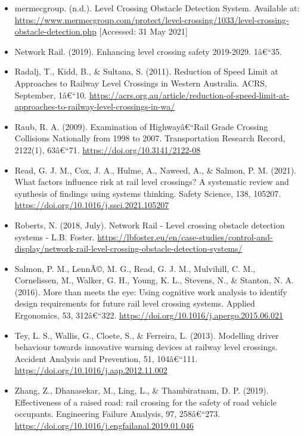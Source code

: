 \documentclass[
]{book}
\begin{document}
\begin{itemize}
\item
  mermecgroup. (n.d.). Level Crossing Obstacle Detection System. Available at: \url{https://www.mermecgroup.com/protect/level-crossing/1033/level-crossing-obstacle-detection.php} {[}Accessed: 31 May 2021{]}
\item
  Network Rail. (2019). Enhancing level crossing safety 2019-2029. 1â€``35.
\item
  Radalj, T., Kidd, B., \& Sultana, S. (2011). Reduction of Speed Limit at Approaches to Railway Level Crossings in Western Australia. ACRS, September, 1â€``10. \url{https://acrs.org.au/article/reduction-of-speed-limit-at-approaches-to-railway-level-crossings-in-wa/}
\item
  Raub, R. A. (2009). Examination of Highwayâ€``Rail Grade Crossing Collisions Nationally from 1998 to 2007. Transportation Research Record, 2122(1), 63â€``71. \url{https://doi.org/10.3141/2122-08}
\item
  Read, G. J. M., Cox, J. A., Hulme, A., Naweed, A., \& Salmon, P. M. (2021). What factors influence risk at rail level crossings? A systematic review and synthesis of findings using systems thinking. Safety Science, 138, 105207. \url{https://doi.org/10.1016/j.ssci.2021.105207}
\item
  Roberts, N. (2018, July). Network Rail - Level crossing obstacle detection systems - L.B. Foster. \url{https://lbfoster.eu/en/case-studies/control-and-display/network-rail-level-crossing-obstacle-detection-systems/}
\item
  Salmon, P. M., LennÃ©, M. G., Read, G. J. M., Mulvihill, C. M., Cornelissen, M., Walker, G. H., Young, K. L., Stevens, N., \& Stanton, N. A. (2016). More than meets the eye: Using cognitive work analysis to identify design requirements for future rail level crossing systems. Applied Ergonomics, 53, 312â€``322. \url{https://doi.org/10.1016/j.apergo.2015.06.021}
\item
  Tey, L. S., Wallis, G., Cloete, S., \& Ferreira, L. (2013). Modelling driver behaviour towards innovative warning devices at railway level crossings. Accident Analysis and Prevention, 51, 104â€``111. \url{https://doi.org/10.1016/j.aap.2012.11.002}
\item
  Zhang, Z., Dhanasekar, M., Ling, L., \& Thambiratnam, D. P. (2019). Effectiveness of a raised road: rail crossing for the safety of road vehicle occupants. Engineering Failure Analysis, 97, 258â€``273. \url{https://doi.org/10.1016/j.engfailanal.2019.01.046}
\end{itemize}
\end{document}
